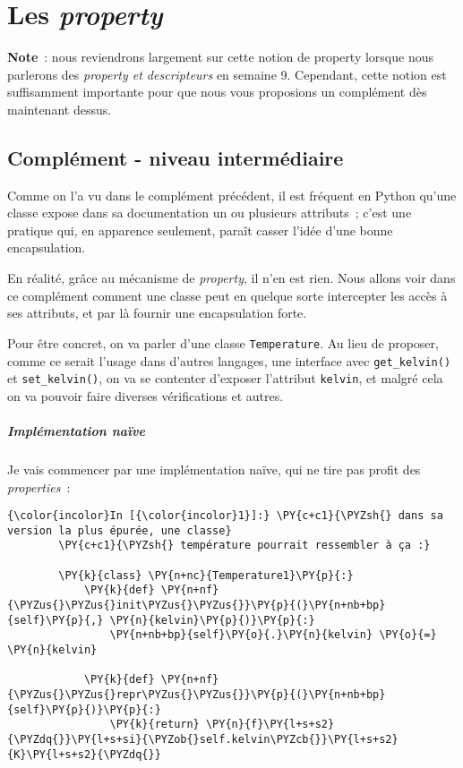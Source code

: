     
    
    
    

    

    \hypertarget{les-property}{%
\section{\texorpdfstring{Les
\emph{property}}{Les property}}\label{les-property}}

    \textbf{Note}~: nous reviendrons largement sur cette notion de property
lorsque nous parlerons des \emph{property et descripteurs} en semaine 9.
Cependant, cette notion est suffisamment importante pour que nous vous
proposions un complément dès maintenant dessus.

    \hypertarget{compluxe9ment---niveau-intermuxe9diaire}{%
\subsection{Complément - niveau
intermédiaire}\label{compluxe9ment---niveau-intermuxe9diaire}}

    Comme on l'a vu dans le complément précédent, il est fréquent en Python
qu'une classe expose dans sa documentation un ou plusieurs attributs~;
c'est une pratique qui, en apparence seulement, paraît casser l'idée
d'une bonne encapsulation.

En réalité, grâce au mécanisme de \emph{property}, il n'en est rien.
Nous allons voir dans ce complément comment une classe peut en quelque
sorte intercepter les accès à ses attributs, et par là fournir une
encapsulation forte.

    Pour être concret, on va parler d'une classe \texttt{Temperature}. Au
lieu de proposer, comme ce serait l'usage dans d'autres langages, une
interface avec \texttt{get\_kelvin()} et \texttt{set\_kelvin()}, on va
se contenter d'exposer l'attribut \texttt{kelvin}, et malgré cela on va
pouvoir faire diverses vérifications et autres.

    \hypertarget{impluxe9mentation-nauxefve}{%
\subparagraph{Implémentation naïve}\label{impluxe9mentation-nauxefve}}

    Je vais commencer par une implémentation naïve, qui ne tire pas profit
des \emph{properties}~:

    \begin{Verbatim}[commandchars=\\\{\}]
{\color{incolor}In [{\color{incolor}1}]:} \PY{c+c1}{\PYZsh{} dans sa version la plus épurée, une classe}
        \PY{c+c1}{\PYZsh{} température pourrait ressembler à ça :}
        
        \PY{k}{class} \PY{n+nc}{Temperature1}\PY{p}{:}
            \PY{k}{def} \PY{n+nf}{\PYZus{}\PYZus{}init\PYZus{}\PYZus{}}\PY{p}{(}\PY{n+nb+bp}{self}\PY{p}{,} \PY{n}{kelvin}\PY{p}{)}\PY{p}{:}
                \PY{n+nb+bp}{self}\PY{o}{.}\PY{n}{kelvin} \PY{o}{=} \PY{n}{kelvin}
                
            \PY{k}{def} \PY{n+nf}{\PYZus{}\PYZus{}repr\PYZus{}\PYZus{}}\PY{p}{(}\PY{n+nb+bp}{self}\PY{p}{)}\PY{p}{:}
                \PY{k}{return} \PY{n}{f}\PY{l+s+s2}{\PYZdq{}}\PY{l+s+si}{\PYZob{}self.kelvin\PYZcb{}}\PY{l+s+s2}{K}\PY{l+s+s2}{\PYZdq{}}
\end{Verbatim}


